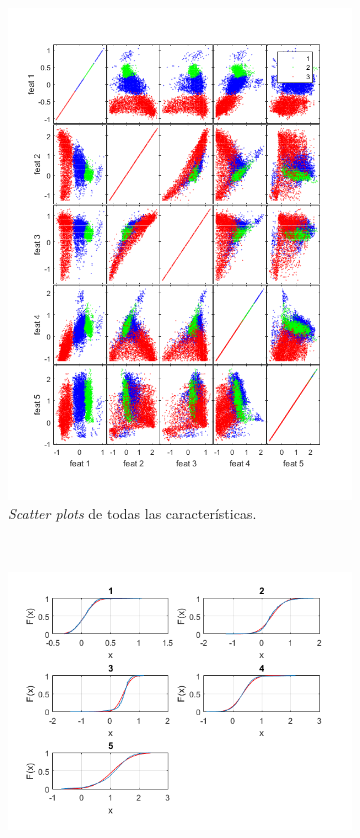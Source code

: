 \documentclass[11pt]{article} %
\begin{document}
\begin{figure}[h]
\begin{subfigure}[b]{0.475 \textwidth}
		\includegraphics[width = \textwidth]{./23/scatter.png}
		\caption{\emph{Scatter plots} de todas las características.}
		\label{fig:23:gray:scatter}
	\end{subfigure}
	~
	\begin{subfigure}[b]{0.475 \textwidth}
		\includegraphics[width = \textwidth]{./23/1_gris/cdfplot.png}

\end{subfigure}
\end{figure}
\end{document}
